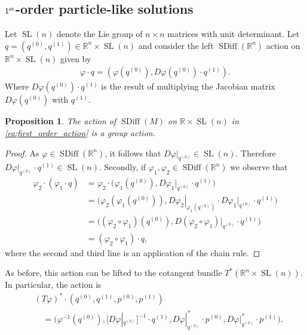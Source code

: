 \documentclass[12pt]{amsart}
\newcommand{\R}{\ensuremath{\mathbb{R}}}
\newtheorem{prop}[thm]{Proposition}
\DeclareMathOperator{\SDiff}{SDiff}
\DeclareMathOperator{\SL}{SL}
\begin{document}
\subsection{$1^{\rm st}$-order particle-like solutions}
\label{sec:first_order}
  Let $\SL(n)$ denote the Lie group of $n\times n$ matrices
  with unit determinant.
  Let $q = (q^{(0)}, q^{(1)}) \in \R^n \times \SL(n)$ and consider the left
  $\SDiff(\R^n)$ action on $\R^n \times \SL(n)$ given by
  \begin{align}
    \varphi \cdot q = (\varphi(q^{(0)} ) , D\varphi(q^{(0)} ) \cdot q^{(1)} ). \label{eq:first_order_action}
  \end{align}
  Where $D\varphi(q^{(0)} ) \cdot q^{(1)}$ is the result of multiplying
  the Jacobian matrix $D\varphi(q^{(0)} )$ with $q^{(1)}$.
  \begin{prop}
    The action of $\SDiff(M)$ on $\R \times \SL(n)$ in \eqref{eq:first_order_action} is a group action.
  \end{prop}
  \begin{proof}
    As $\varphi \in \SDiff(\R^n)$, it follows that $D\varphi |_{q^{(0)}} \in \SL(n)$.
    Therefore $D\varphi |_{q^{(0)}} \cdot q^{(1)} \in \SL(n)$.
    Secondly, if $\varphi_1,\varphi_2 \in \SDiff(\R^n)$ we observe that
    \begin{align*}
      \varphi_2 \cdot (\varphi_1 \cdot q)
      &= \varphi_2 \cdot \big(\varphi_1(q^{(0)} ) , D\varphi_1 |_{q^{(0)}} \cdot q^{(1)} \big) \\
      &= \big(\varphi_2(\varphi_1(q^{(0)} )) , \left. D\varphi_2 \right|_{\varphi_1( q^{(0)} )} \cdot D\varphi_1 |_{ q^{(0)} } \cdot q^{(1)} \big) \\
      &= \big( (\varphi_2 \circ \varphi_1)(q^{(0)} ) , D( \varphi_2 \circ \varphi_1)|_{q^{(0)} } \cdot q^{(1)} \big) \\
      &= (\varphi_2 \circ \varphi_1) \cdot q,
    \end{align*}
    where the second and third line is an application of the chain rule.
  \end{proof}
  As before, this action can be lifted to the cotangent bundle $T^*(\R^n \times \SL(n))$.  In particular, 
  the action is
  \begin{align*}
    &(T\varphi)^* \cdot ( q^{(0)} , q^{(1)}  , p^{(0)} , p^{(1)} ) \\
    &\quad = \big( \varphi^{-1}(q^{(0)})  , [D\varphi|_{q^{(0)}}]^{-1} \cdot q^{(1)} , D\varphi|_{q^{(0)}}^* \cdot p^{(0)} , D\varphi|_{q^{(0)}}^* \cdot p^{(1)} \big).
  \end{align*}
\end{document}
